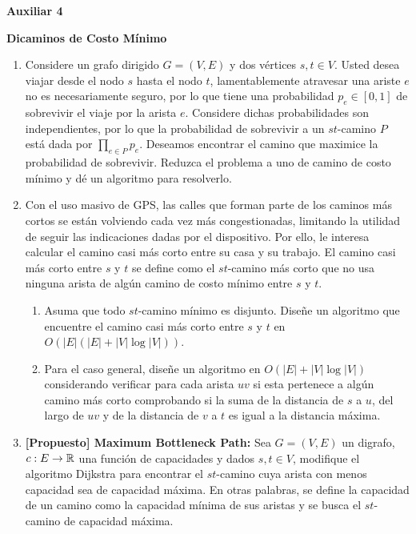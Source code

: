 

\header
\begin{center}
	\LARGE \bf{Auxiliar 4}
\end{center}

\begin{center}
	\bf{Dicaminos de Costo Mínimo}\\
\end{center}

\begin{enumerate}[label ={\bf P\arabic*}]
	\item Considere un grafo dirigido $G = (V,E)$ y dos vértices $s,t \in V$. Usted desea viajar desde el nodo $s$ hasta
	el nodo $t$, lamentablemente atravesar una ariste $e$ no es necesariamente seguro, por lo que tiene una
	probabilidad $p_e \in [0, 1]$ de sobrevivir el viaje por la arista $e$.
	Considere dichas probabilidades son independientes, por lo que la probabilidad de sobrevivir a un $st$-camino $P$ está
	dada por $\prod_{e\in P} p_e$. Deseamos encontrar el camino que maximice la probabilidad de sobrevivir.
	Reduzca el problema a uno de camino de costo mínimo y dé un algoritmo para resolverlo.

	\item Con el uso masivo de GPS, las calles que forman parte de los caminos más cortos se están volviendo cada vez más
	congestionadas, limitando la utilidad de seguir las indicaciones dadas por el dispositivo. Por ello, le interesa calcular
	el camino casi más corto entre su casa y su trabajo. El camino casi más corto entre $s$ y $t$ se define como el $st$-camino
	más corto que no usa ninguna arista de algún camino de costo mínimo entre $s$ y $t$.
	
	\begin{enumerate}
		\item Asuma que todo $st$-camino mínimo es disjunto. Diseñe un algoritmo que encuentre
		el camino casi más corto entre $s$ y $t$ en $O(|E|(|E|+|V|\log|V|))$.
		\item Para el caso general, diseñe un algoritmo en $O(|E|+|V|\log|V|)$ considerando verificar para cada arista $uv$ si esta pertenece a algún camino más corto comprobando si la suma de la distancia de $s$ a $u$, del largo de $uv$ y de la distancia de $v$ a $t$ es igual a la distancia máxima.
	\end{enumerate}

	\item \textbf{[Propuesto] Maximum Bottleneck Path:} Sea $G = (V,E)$ un digrafo, $c: E \to \mathbb{R}$ una función de capacidades y dados $s, t \in V$,
	modifique el algoritmo Dijkstra para encontrar el $st$-camino cuya arista con menos capacidad sea de capacidad máxima.
	En otras palabras, se define la capacidad de un camino como la capacidad mínima de sus aristas y se busca el $st$-camino de capacidad máxima.


\end{enumerate}
